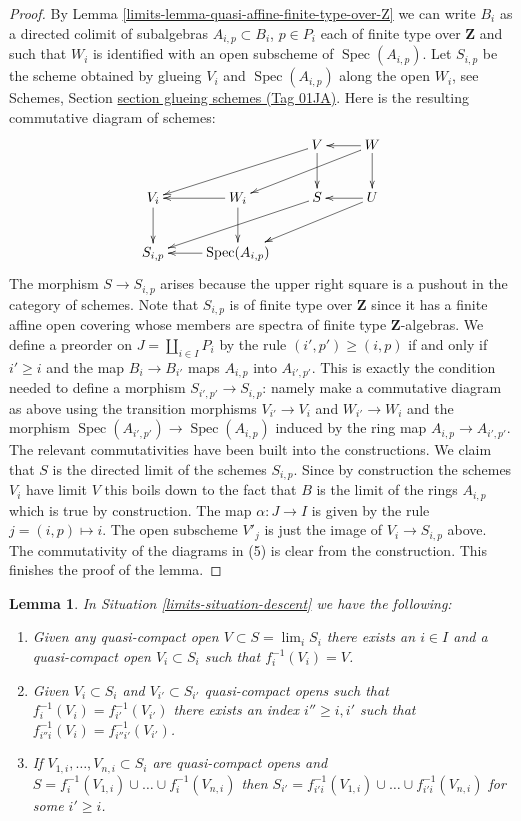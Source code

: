 \documentclass{amsart}
\theoremstyle{plain}
\newtheorem{lemma}[subsection]{Lemma}
\theoremstyle{definition}
\theoremstyle{remark}
\numberwithin{equation}{subsection}
\def\lim{\mathop{\mathrm{lim}}\nolimits}
\def\Spec{\mathop{\mathrm{Spec}}}
\begin{document}
\begin{proof}
\medskip\noindent
By Lemma \ref{limits-lemma-quasi-affine-finite-type-over-Z}
we can write $B_i$ as a directed colimit of subalgebras
$A_{i, p} \subset B_i$, $p \in P_i$ each
of finite type over $\mathbf{Z}$ and such that $W_i$ is
identified with an open subscheme of $\Spec(A_{i, p})$.
Let $S_{i, p}$ be the scheme obtained by glueing
$V_i$ and $\Spec(A_{i, p})$ along the open $W_i$, see
Schemes, Section \href{https://stacks.math.columbia.edu/tag/01JA}{section glueing schemes (Tag 01JA)}.
Here is the resulting commutative diagram of schemes:
$$
\xymatrix{
& & V \ar[lld] \ar[d] & W \ar[l] \ar[lld] \ar[d] \\
V_i \ar[d] & W_i \ar[l] \ar[d] & S \ar[lld] & U \ar[lld] \ar[l] \\
S_{i, p} & \Spec(A_{i, p}) \ar[l]
}
$$
The morphism $S \to S_{i, p}$ arises because the upper right
square is a pushout in the category of schemes.
Note that $S_{i, p}$ is of finite type over $\mathbf{Z}$ since
it has a finite affine open covering whose members are
spectra of finite type $\mathbf{Z}$-algebras.
We define a preorder on $J = \coprod_{i \in I} P_i$
by the rule $(i', p') \geq (i, p)$ if and only if
$i' \geq i$ and the map $B_i \to B_{i'}$ maps $A_{i, p}$ into
$A_{i', p'}$. This is exactly the condition needed to
define a morphism $S_{i', p'} \to S_{i, p}$: namely make a commutative
diagram as above using the transition morphisms $V_{i'} \to V_i$
and $W_{i'} \to W_i$ and
the morphism $\Spec(A_{i', p'}) \to \Spec(A_{i, p})$ induced
by the ring map $A_{i, p} \to A_{i', p'}$. The relevant commutativities
have been built into the constructions.
We claim that $S$ is the directed limit of the schemes $S_{i, p}$.
Since by construction the schemes $V_i$ have limit $V$ this boils
down to the fact that $B$ is the limit of the rings $A_{i, p}$
which is true by construction. The map $\alpha : J \to I$ is given
by the rule $j = (i, p) \mapsto i$. The open subscheme $V'_j$ is
just the image of $V_i \to S_{i, p}$ above. The commutativity of
the diagrams in (5) is clear from the construction.
This finishes the proof of the lemma.
\end{proof}


\begin{lemma}
\label{limits-lemma-descend-opens}
In Situation \ref{limits-situation-descent} we have the following:
\begin{enumerate}
\item Given any quasi-compact open $V \subset S = \lim_i S_i$
there exists an $i \in I$ and a quasi-compact open $V_i \subset S_i$
such that $f_i^{-1}(V_i) = V$.
\item Given $V_i \subset S_i$ and $V_{i'} \subset S_{i'}$
quasi-compact opens such that $f_i^{-1}(V_i) = f_{i'}^{-1}(V_{i'})$
there exists an index $i'' \geq i, i'$ such that
$f_{i''i}^{-1}(V_i) = f_{i''i'}^{-1}(V_{i'})$.
\item If $V_{1, i}, \ldots, V_{n, i} \subset S_i$ are quasi-compact
opens and $S = f_i^{-1}(V_{1, i}) \cup \ldots \cup f_i^{-1}(V_{n, i})$
then $S_{i'} = f_{i'i}^{-1}(V_{1, i}) \cup \ldots \cup f_{i'i}^{-1}(V_{n, i})$
for some $i' \geq i$.
\end{enumerate}
\end{lemma}
\end{document}
